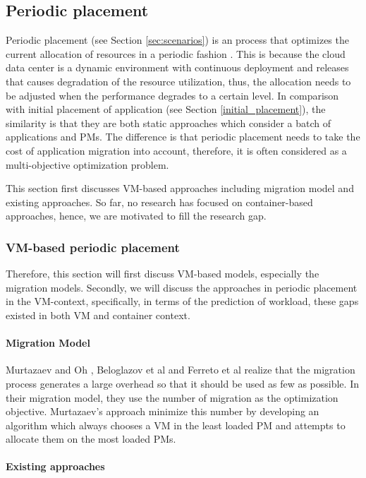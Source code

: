 \subsection{Periodic placement}
Periodic placement (see Section \ref{sec:scenarios}) is an process that optimizes the current allocation of resources in a periodic fashion \cite{Mishra:2012kx}. This is because the cloud data center is a dynamic environment with continuous deployment and releases that causes degradation of the resource utilization, thus, the allocation needs to be adjusted when the performance degrades to a certain level. In comparison with initial placement of application (see Section \ref{initial_placement}), the similarity is that they are both static approaches which consider a batch of applications and PMs. The difference is that periodic placement needs to take the cost of application migration into account, therefore, it is often considered as a multi-objective optimization problem. 


This section first discusses VM-based approaches including migration model and existing approaches. So far, no research has focused on container-based approaches, hence, we are motivated to fill the research gap.


\subsubsection{VM-based periodic placement}
Therefore, this section will first discuss VM-based models, especially the migration models. Secondly, we will discuss the approaches in periodic placement in the VM-context, specifically, in terms of the prediction of workload, these gaps existed in both VM and container context. 

\paragraph{Migration Model}
Murtazaev and Oh \cite{Murtazaev:2014eo}, Beloglazov et al \cite{Beloglazov:2012ji} and Ferreto et al \cite{Ferreto:2011iia} realize that the migration process generates a large overhead so that it should be used as few as possible. In their migration model, they use the number of migration as the optimization objective. Murtazaev's approach minimize this number by developing an algorithm which always chooses a VM in the least loaded PM and attempts to allocate them on the most loaded PMs. 

\paragraph{Existing approaches}




